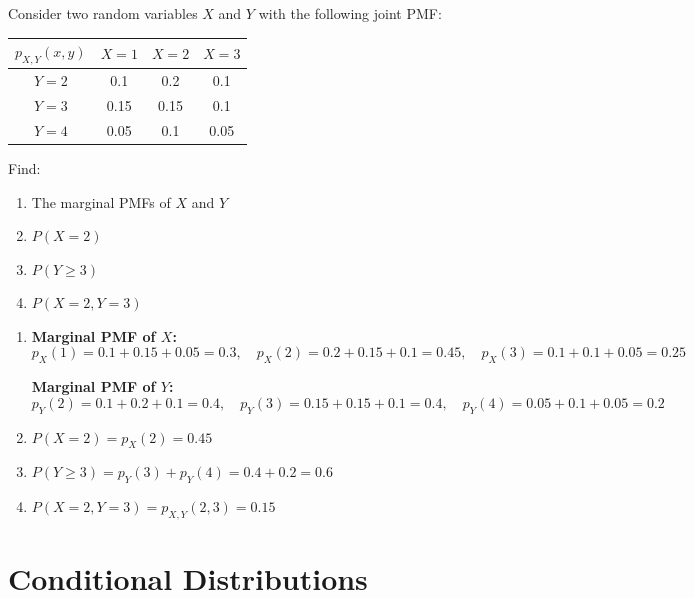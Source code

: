 \begin{eg}
Consider two random variables $X$ and $Y$ with the following joint PMF:

\begin{center}
\renewcommand{\arraystretch}{1.5}
\begin{tabular}{c|ccc}
$p_{X,Y}(x,y)$ & $X=1$ & $X=2$ & $X=3$ \\ \hline
$Y=2$ & 0.1 & 0.2 & 0.1 \\
$Y=3$ & 0.15 & 0.15 & 0.1 \\
$Y=4$ & 0.05 & 0.1 & 0.05 \\
\end{tabular}
\end{center}

Find:
\begin{enumerate}[label=(\alph*)]
    \item The marginal PMFs of $X$ and $Y$
    \item $P(X = 2)$
    \item $P(Y \geq 3)$
    \item $P(X = 2, Y = 3)$
\end{enumerate}

\begin{solution}
\begin{enumerate}[label=(\alph*)]
    \item \textbf{Marginal PMF of $X$:}
    \[
    p_X(1) = 0.1 + 0.15 + 0.05 = 0.3, \quad p_X(2) = 0.2 + 0.15 + 0.1 = 0.45, \quad p_X(3) = 0.1 + 0.1 + 0.05 = 0.25
    \]
    
    \textbf{Marginal PMF of $Y$:}
    \[
    p_Y(2) = 0.1 + 0.2 + 0.1 = 0.4, \quad p_Y(3) = 0.15 + 0.15 + 0.1 = 0.4, \quad p_Y(4) = 0.05 + 0.1 + 0.05 = 0.2
    \]
    
    \item $P(X = 2) = p_X(2) = 0.45$
    
    \item $P(Y \geq 3) = p_Y(3) + p_Y(4) = 0.4 + 0.2 = 0.6$
    
    \item $P(X = 2, Y = 3) = p_{X,Y}(2, 3) = 0.15$
\end{enumerate}
\end{solution}
\end{eg}

\section{Conditional Distributions}


